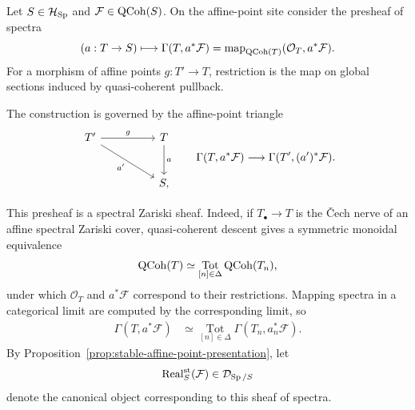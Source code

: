 \begin{construction}
\label{con:stable-realization-qcoh}
Let \(S\in\mathcal H_{\operatorname{Sp}}\) and \(\mathcal F\in\operatorname{QCoh}(S)\). On the
affine-point site consider the presheaf of spectra
\[
  (a:T\to S)
  \longmapsto
  \Gamma(T,a^*\mathcal F)
  =
  \operatorname{map}_{\operatorname{QCoh}(T)}(\mathcal O_T,a^*\mathcal F).
\]
For a morphism of affine points \(g:T'\to T\), restriction is the map on global
sections induced by quasi-coherent pullback.

The construction is governed by the affine-point triangle
\[
\begin{tikzcd}[column sep=huge,row sep=large]
  T' \arrow[r,"g"] \arrow[dr,"a'"']
  & T \arrow[d,"a"]
  \\
  & S,
\end{tikzcd}
\qquad
\Gamma(T,a^*\mathcal F)
\longrightarrow
\Gamma(T',(a')^*\mathcal F).
\]

This presheaf is a spectral Zariski sheaf. Indeed, if \(T_\bullet\to T\) is the
\v{C}ech nerve of an affine spectral Zariski cover, quasi-coherent descent gives a
symmetric monoidal equivalence
\[
  \operatorname{QCoh}(T)
  \simeq
  \operatorname*{Tot}_{[n]\in\Delta}\operatorname{QCoh}(T_n),
\]
under which \(\mathcal O_T\) and \(a^*\mathcal F\) correspond to their
restrictions. Mapping spectra in a categorical limit are computed by the
corresponding limit, so
\[
\begin{aligned}
  \Gamma(T,a^*\mathcal F)
  &\simeq
  \operatorname*{Tot}_{[n]\in\Delta}
  \Gamma(T_n,a_n^*\mathcal F).
\end{aligned}
\]
By Proposition~\ref{prop:stable-affine-point-presentation}, let
\[
  \operatorname{Real}^{\mathrm{st}}_S(\mathcal F)
  \in
  \mathcal D_{\operatorname{Sp}/S}
\]
denote the canonical object corresponding to this sheaf of spectra.
\end{construction}

